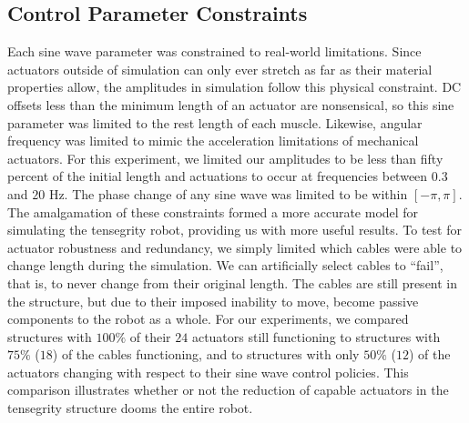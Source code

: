 \documentclass{llncs}
\begin{document}
\subsection{Control Parameter Constraints}
\label{sineconstraints} {
Each sine wave parameter was constrained to real-world limitations.
Since actuators outside of simulation can only ever stretch as far as their material properties allow, the amplitudes in simulation follow this physical constraint.
DC offsets less than the minimum length of an actuator are nonsensical, so this sine parameter was limited to the rest length of each muscle.
Likewise, angular frequency was limited to mimic the acceleration limitations of mechanical actuators. 
For this experiment, we limited our amplitudes to be less than fifty percent of the initial length and actuations to occur at frequencies between $0.3$ and $20$ Hz.
The phase change of any sine wave was limited to be within $[-\pi, \pi]$.
The amalgamation of these constraints formed a more accurate model for simulating the tensegrity robot, providing us with more useful results. 
}
\label{robustconstraints} {
To test for actuator robustness and redundancy, we simply limited which cables were able to change length during the simulation.
We can artificially select cables to ``fail'', that is, to never change from their original length.
The cables are still present in the structure, but due to their imposed inability to move, become passive components to the robot as a whole.
For our experiments, we compared structures with $100\%$ of their $24$ actuators still functioning to structures with $75\%$ ($18$) of the cables functioning, and to structures with only $50\%$ ($12$) of the actuators changing with respect to their sine wave control policies.
This comparison illustrates whether or not the reduction of capable actuators in the tensegrity structure dooms the entire robot.
}
                                                                                                                                   
\end{document}
